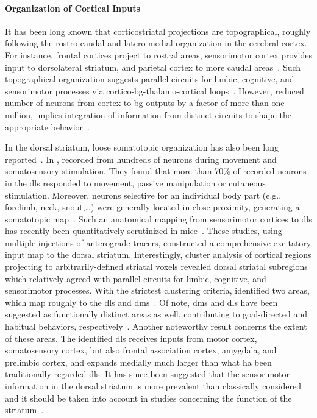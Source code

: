 \paragraph{Organization of Cortical Inputs}
It has been long known that corticostriatal projections are topographical, roughly following the rostro-caudal and latero-medial organization in the cerebral cortex.
For instance, frontal cortices project to rostral areas, sensorimotor cortex provides input to dorsolateral striatum, and parietal cortex to more caudal areas~\cite{Dudman2015Book}.
Such topographical organization suggests parallel circuits for limbic, cognitive, and sensorimotor processes via cortico-\gls{bg}-thalamo-cortical loops~\cite{Alexander1986}.
However, reduced number of neurons from cortex to \gls{bg} outputs by a factor of more than one million, implies integration of information from distinct circuits to shape the appropriate behavior~\cite{Boraud2018ProgNeurobiol}.
\par
In the dorsal striatum, loose somatotopic organization has also been long reported~\cite[see][as an early review]{Mink1996}.
In \citeyear{Carelli1991}, \citeauthor{Carelli1991} recorded from hundreds of neurons during movement and somatosensory stimulation.
They found that more than 70\% of recorded neurons in the \gls{dls} responded to movement, passive manipulation or cutaneous stimulation.
Moreover, neurons selective for an individual body part (e.g., forelimb, neck, snout,\dots) were generally located in close proximity, generating a somatotopic map~\cite{Carelli1991}.
Such an anatomical mapping from sensorimotor cortices to \gls{dls} has recently been quantitatively scrutinized in mice~\cite{Hunnicutt2016, Hintiryan2016NN}.
These studies, using multiple injections of anterograde tracers, constructed a comprehensive excitatory input map to the dorsal striatum.
Interestingly, cluster analysis of cortical regions projecting to arbitrarily-defined striatal voxels revealed dorsal striatal subregions which relatively agreed with parallel circuits for limbic, cognitive, and sensorimotor processes.
With the strictest clustering criteria, \citeauthor{Hunnicutt2016} identified two areas, which map roughly to the \gls{dls} and \gls{dms}~\cite{Hunnicutt2016}.
Of note, \gls{dms} and \gls{dls} have been suggested as functionally distinct areas as well, contributing to goal-directed and habitual behaviors, respectively~\cite{Yin2006NatRevNeurosci}.
Another noteworthy result concerns the extent of these areas.
The identified \gls{dls} receives inputs from motor cortex, somatosensory cortex, but also frontal association cortex, amygdala, and prelimbic cortex, and expands medially much larger than what ha been traditionally regarded \gls{dls}.
It has since been suggested that the sensorimotor information in the dorsal striatum is more prevalent than classically considered and it should be taken into account in studies concerning the function of the striatum~\cite{Robbe2018}.


